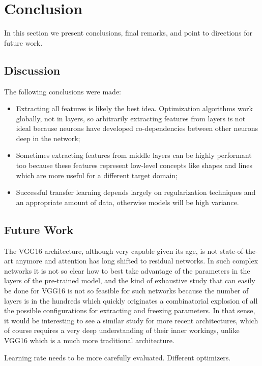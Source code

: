 \chapter{Conclusion}
\label{chapter:conclusion}

In this section we present conclusions, final remarks, and point to directions for future work.

\section{Discussion}

The following conclusions were made:

\begin{itemize}
    \item Extracting all features is likely the best idea. Optimization algorithms work globally, not in layers, so arbitrarily extracting features from layers is not ideal because neurons have developed co-dependencies between other neurons deep in the network;
    \item Sometimes extracting features from middle layers can be highly performant too because these features represent low-level concepts like shapes and lines which are more useful for a different target domain;
    \item Successful transfer learning depends largely on regularization techniques and an appropriate amount of data, otherwise models will be high variance.
\end{itemize}

\section{Future Work}

The VGG16 architecture, although very capable given its age, is not state-of-the-art anymore and attention has long shifted to residual networks. In such complex networks it is not so clear how to best take advantage of the parameters in the layers of the pre-trained model, and the kind of exhaustive study that can easily be done for VGG16 is not so feasible for such networks because the number of layers is in the hundreds which quickly originates a combinatorial explosion of all the possible configurations for extracting and freezing parameters. In that sense, it would be interesting to see a similar study for more recent architectures, which of course requires a very deep understanding of their inner workings, unlike VGG16 which is a much more traditional architecture.

Learning rate needs to be more carefully evaluated. Different optimizers.
